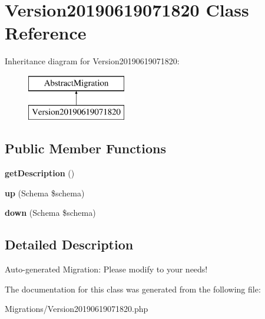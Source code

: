 \hypertarget{class_doctrine_migrations_1_1_version20190619071820}{}\section{Version20190619071820 Class Reference}
\label{class_doctrine_migrations_1_1_version20190619071820}
Inheritance diagram for Version20190619071820\+:\begin{figure}[H]
\begin{center}
\leavevmode
\includegraphics[height=2.000000cm]{class_doctrine_migrations_1_1_version20190619071820}
\end{center}
\end{figure}
\subsection*{Public Member Functions}
\begin{DoxyCompactItemize}
\item 
\mbox{\label{class_doctrine_migrations_1_1_version20190619071820_a2e7bb35c71bf1824456ceb944cb7a845}} 
{\bfseries get\+Description} ()
\item 
\mbox{\label{class_doctrine_migrations_1_1_version20190619071820_a23eb1c1428e8ea2ab2cf798fc06ec421}} 
{\bfseries up} (Schema \$schema)
\item 
\mbox{\label{class_doctrine_migrations_1_1_version20190619071820_aa8eb70255a46429d4d6165c778c9e5b9}} 
{\bfseries down} (Schema \$schema)
\end{DoxyCompactItemize}


\subsection{Detailed Description}
Auto-\/generated Migration\+: Please modify to your needs! 

The documentation for this class was generated from the following file\+:\begin{DoxyCompactItemize}
\item 
Migrations/Version20190619071820.\+php\end{DoxyCompactItemize}
